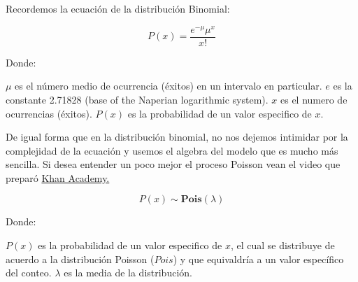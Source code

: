 \documentclass[
]{book}
\newenvironment{Shaded}{\begin{snugshade}}{\end{snugshade}}
\newcommand{\DataTypeTok}[1]{\textcolor[rgb]{0.13,0.29,0.53}{#1}}
\newcommand{\DecValTok}[1]{\textcolor[rgb]{0.00,0.00,0.81}{#1}}
\newcommand{\KeywordTok}[1]{\textcolor[rgb]{0.13,0.29,0.53}{\textbf{#1}}}
\newcommand{\NormalTok}[1]{#1}
\newcommand{\OperatorTok}[1]{\textcolor[rgb]{0.81,0.36,0.00}{\textbf{#1}}}
\newcommand{\StringTok}[1]{\textcolor[rgb]{0.31,0.60,0.02}{#1}}
\begin{document}
Recordemos la ecuación de la distribución Binomial:

\begin{equation} 
  P\left( x \right) = \frac{{e^{ - \mu } \mu ^x }}{{x!}}
  \label{eq:binom}
\end{equation}

Donde:

\(\mu\) es el número medio de ocurrencia (éxitos) en un intervalo en particular.
\(e\) es la constante 2.71828 (base of the Naperian logarithmic system).
\(x\) es el numero de ocurrencias (éxitos).
\(P(x)\) es la probabilidad de un valor especifico de \(x\).

De igual forma que en la distribución binomial, no nos dejemos intimidar por la complejidad de la ecuación y usemos el algebra del modelo que es mucho más sencilla. Si desea entender un poco mejor el proceso Poisson vean el video que preparó \href{https://www.youtube.com/watch?v=Vhjiw8r8kR4}{Khan Academy.}

\begin{equation} 
  P\left( x \right) \sim \mathbf{Pois}(\lambda)
  \label{eq:binom}
\end{equation}

Donde:

\(P(x)\) es la probabilidad de un valor especifico de \(x\), el cual se distribuye de acuerdo a la distribución Poisson (\(Pois\)) y que equivaldría a un valor específico del conteo.
\(\lambda\) es la media de la distribución.

\begin{Shaded}
\end{Shaded}
\end{document}
